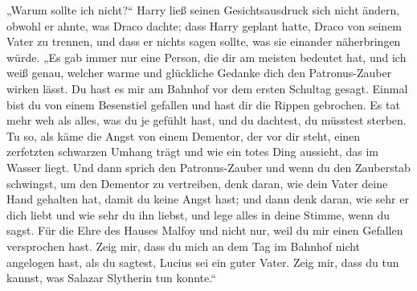 „Warum sollte ich nicht?“ Harry ließ seinen Gesichtsausdruck sich nicht ändern, obwohl er ahnte, was Draco dachte; dass Harry geplant hatte, Draco von seinem Vater zu trennen, und dass er nichts sagen sollte, was sie einander näherbringen würde.
„Es gab immer nur eine Person, die dir am meisten bedeutet hat, und ich weiß genau, welcher warme und glückliche Gedanke dich den Patronus-Zauber wirken lässt. Du hast es mir am Bahnhof vor dem ersten Schultag gesagt. Einmal bist du von einem Besenstiel gefallen und hast dir die Rippen gebrochen. Es tat mehr weh als alles, was du je gefühlt hast, und du dachtest, du müsstest sterben. Tu so, als käme die Angst von einem Dementor, der vor dir steht, einen zerfetzten schwarzen Umhang trägt und wie ein totes Ding aussieht, das im Wasser liegt. Und dann sprich den Patronus-Zauber und wenn du den Zauberstab schwingst, um den Dementor zu vertreiben, denk daran, wie dein Vater deine Hand gehalten hat, damit du keine Angst hast; und dann denk daran, wie sehr er dich liebt und wie sehr du ihn liebst, und lege alles in deine Stimme, wenn du  sagst. Für die Ehre des Hauses Malfoy und nicht nur, weil du mir einen Gefallen versprochen hast. Zeig mir, dass du mich an dem Tag im Bahnhof nicht angelogen hast, als du sagtest, Lucius sei ein guter Vater. Zeig mir, dass du tun kannst, was Salazar Slytherin tun konnte.“

